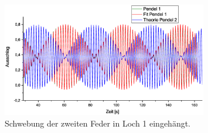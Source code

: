 \begin{figure}
\begin{center}
\includegraphics[width=0.8\textwidth]{Bilder/Feder2_Schwebung.eps}
\caption{Schwebung der zweiten Feder in Loch 1 eingehängt.}
\label{fig:schwebung1}
\end{center}
\end{figure}



